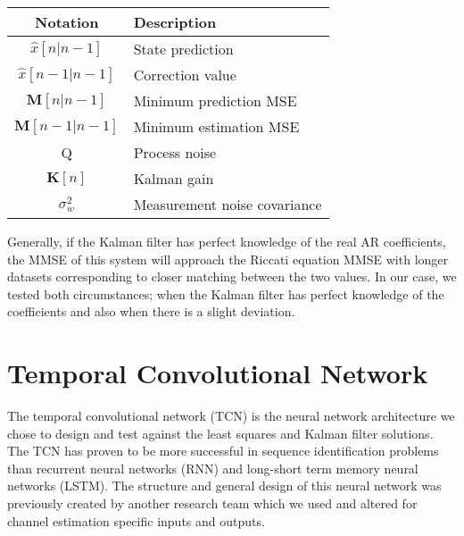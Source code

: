 \documentclass[twocolumn,letterpaper]{IEEEAerospaceCLS}  %
\begin{document}
\begin{table}[h!]
\centering
\begin{tabular}{|c|l|}
\hline
Notation           & Description \\ \hline              
\multirow{2}{*}{$\hat{x}[n|n-1]$} & \multirow{2}{*}{State prediction} \\
                   & \\ \hline
\multirow{2}{*}{$\hat{x}[n-1|n-1]$} & \multirow{2}{*}{Correction value} \\
                   & \\ \hline
\multirow{2}{*}{$\textbf{M}[n|n-1]$} & \multirow{2}{*}{Minimum prediction MSE} \\
                   & \\ \hline
\multirow{2}{*}{$\textbf{M}[n-1|n-1]$} & \multirow{2}{*}{Minimum estimation MSE} \\
                   & \\ \hline
\multirow{2}{*}{Q} & \multirow{2}{*}{Process noise} \\
                   & \\ \hline
\multirow{2}{*}{$\textbf{K}[n]$} & \multirow{2}{*}{Kalman gain} \\
                   & \\ \hline
\multirow{2}{*}{$\sigma_{w}^2$} & \multirow{2}{*}{Measurement noise covariance} \\
                   & \\ \hline
\end{tabular}
\end{table}

Generally, if the Kalman filter has perfect knowledge of the real AR coefficients, the MMSE of this system will approach the Riccati equation MMSE with longer datasets corresponding to closer matching between the two values. In our case, we tested both circumstances; when the Kalman filter has perfect knowledge of the coefficients and also when there is a slight deviation. 

\section{Temporal Convolutional Network}
\label{sec:TCN}

The temporal convolutional network (TCN) is the neural network architecture we chose to design and test against the least squares and Kalman filter solutions. The TCN has proven to be more successful in sequence identification problems than recurrent neural networks (RNN) and long-short term memory neural networks (LSTM). The structure and general design of this neural network was previously created by another research team \cite{BaiTCN2018} which we used and altered for channel estimation specific inputs and outputs. 
\end{document}
